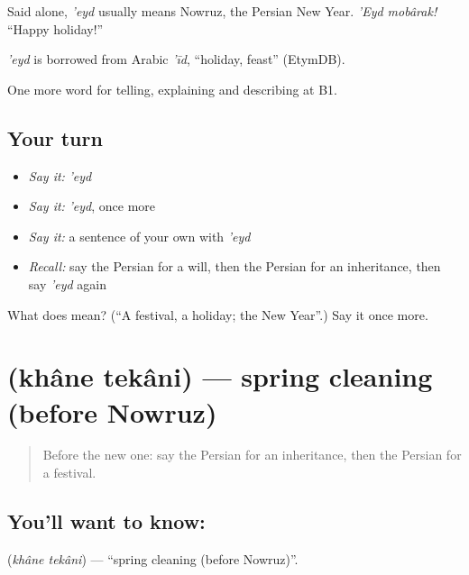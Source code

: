 Said alone, \emph{'eyd} usually means Nowruz, the Persian New Year. \emph{'Eyd mobârak!} \textquotedblleft{}Happy holiday!\textquotedblright{}

\begin{cousinweb}
\emph{'eyd} is borrowed from Arabic \emph{'īd}, \textquotedblleft{}holiday, feast\textquotedblright{} (EtymDB).
\end{cousinweb}

\begin{grammarlens}[title={What you've built}]
One more word for telling, explaining and describing at B1.
\end{grammarlens}

\subsection*{Your turn}
\begin{itemize}
\raggedright
  \item \emph{Say it:} \emph{'eyd}
  \item \emph{Say it:} \emph{'eyd}, once more
  \item \emph{Say it:} a sentence of your own with \emph{'eyd}
  \item \emph{Recall:} say the Persian for a will, then the Persian for an inheritance, then say \emph{'eyd} again
\end{itemize}

\begin{tcolorbox}[breakable,colback=teal!4,colframe=teal!35!black,title={Before you move on}]
What does  mean? (\textquotedblleft{}A festival, a holiday; the New Year\textquotedblright{}.) Say it once more.
\end{tcolorbox}
\section[\texorpdfstring{\fa{خانه} \fa{تکانی} (khâne tekâni)}{خانه تکانی (khâne tekâni)}]{  (khâne tekâni) — spring cleaning (before Nowruz)}

\label{lesson:FA-C339-khane-tekani}



\begin{quote}
Before the new one: say the Persian for an inheritance, then the Persian for a festival.
\end{quote}

\subsection*{You'll want to know:  }
\textbf{ } (\emph{khâne tekâni}) — \textquotedblleft{}spring cleaning (before Nowruz)\textquotedblright{}.


